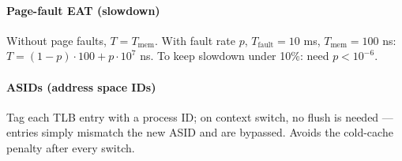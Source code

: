 \paragraph{Page-fault EAT (slowdown)}
Without page faults, $T=T_{\mathrm{mem}}$. With fault rate $p$, $T_{\mathrm{fault}}=10$ ms, $T_{\mathrm{mem}}=100$ ns: $T=(1-p)\!\cdot\!100+p\!\cdot\!10^7$ ns. To keep slowdown under 10\%: need $p<10^{-6}$.

\paragraph{ASIDs (address space IDs)}
Tag each TLB entry with a process ID; on context switch, no flush is needed — entries simply mismatch the new ASID and are bypassed. Avoids the cold-cache penalty after every switch.
